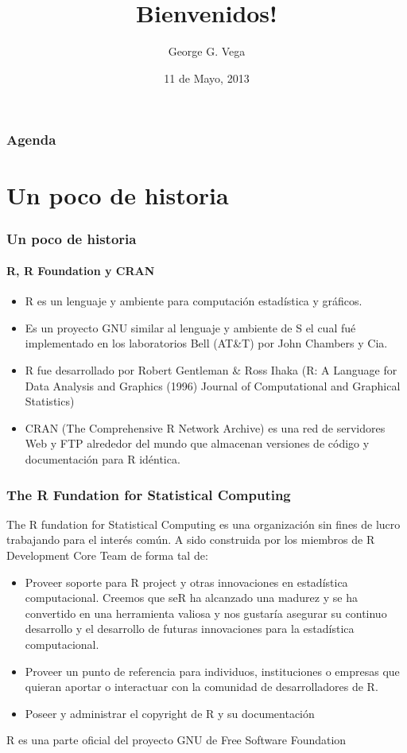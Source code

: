 \documentclass{beamer}\usepackage{graphicx, color}
\title[useRChile]{Bienvenidos!}
\author[GGV]{George G. Vega}
\institute[useRchile]{Grupo de Usuarios de R en Chile}
\date{11 de Mayo, 2013}
\begin{document}
\begin{frame}
\maketitle
\end{frame}

\begin{frame}

\frametitle{Agenda}
\tableofcontents
\end{frame}

\section{Un poco de historia}


\begin{frame}
\frametitle{Un poco de historia}
\framesubtitle{R, R Foundation y CRAN}
\begin{itemize}[<+->]
\item R es un lenguaje y ambiente para computaci\'on estad\'istica y gr\'aficos.
\item Es un proyecto GNU similar al lenguaje y ambiente de S el cual fu\'e implementado en los laboratorios Bell (AT\&T) por John Chambers y Cia.
\item R fue desarrollado por Robert Gentleman \& Ross Ihaka (R: A Language for Data Analysis and Graphics (1996)
Journal of Computational and Graphical Statistics)
\item CRAN (The Comprehensive R Network Archive) es una red de servidores Web y FTP alrededor del mundo que almacenan versiones de c\'odigo y documentaci\'on para R id\'entica.
\end{itemize}
\end{frame}

\begin{frame}[fragile]
\frametitle{The R Fundation for Statistical Computing}
The R fundation for Statistical Computing es una organizaci\'on sin fines de lucro trabajando
para el inter\'es com\'un. A sido construida por los miembros de R Development Core Team de
forma tal de:
\begin{itemize}[<+->]
\item Proveer soporte para R project y otras innovaciones en estad\'istica computacional. Creemos
que seR ha alcanzado una madurez y se ha convertido en una herramienta valiosa y nos gustar\'ia
asegurar su continuo desarrollo y el desarrollo de futuras innovaciones para la estad\'istica
computacional.
\item Proveer un punto de referencia para individuos, instituciones o empresas que quieran
aportar o interactuar  con la comunidad de desarrolladores de R.
\item Poseer y administrar el copyright de R y su documentaci\'on
\end{itemize}

R es una parte oficial del proyecto GNU de Free Software Foundation
\end{frame}
\end{document}
